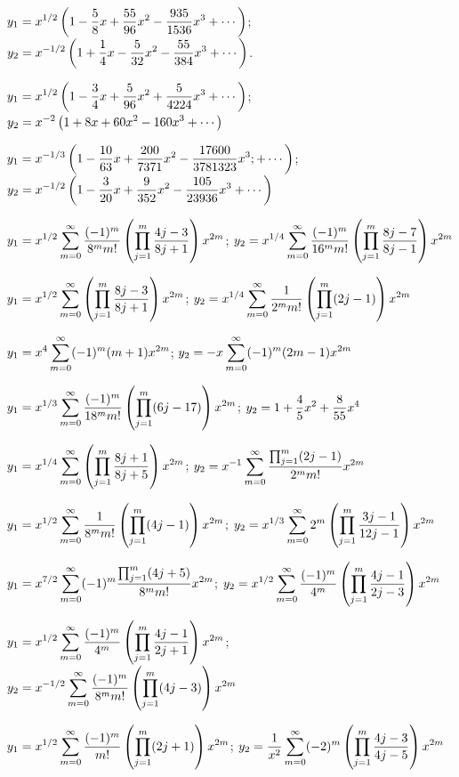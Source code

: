 $y_1=\displaystyle{x^{1/2}\left(1-\frac{5}{8}x+\frac{55}{96}x^2
-\frac{935}{1536}x^3+\cdots\right)}$;    \,
$y_2=\displaystyle{x^{-1/2}\left(1+\frac{1}{4}x-\frac{5}{32}x^2
-\frac{55}{384}x^3+\cdots\right)}$.

$y_1=\displaystyle{x^{1/2}\left(1-\frac{3}{4}x+\frac{5}{96}x^2+\frac{5}{4224}x^3
+\cdots\right)}$;    \,
$y_2=\displaystyle{x^{-2}\left(1+8x+60x^2-160x^3+\cdots\right)}$

$y_1=\displaystyle{x^{-1/3}\left(1-\frac{10}{63}x+\frac{200}{7371}x^2-
\frac{17600}{3781323}x^3;
+\cdots\right)}$;    \,
$y_2=\displaystyle{x^{-1/2}\left(1-\frac{3}{20}x+\frac{9}{352}x^2
-\frac{105}{23936}x^3
+\cdots\right)}$

$y_1=\displaystyle{x^{1/2}\sum_{m=0}^\infty\frac{(-1)^m}{8^mm!}\left(\prod_{j=1}^m\frac{4j-3}{8j+1}\right)x^{2m}}$;
$y_2=\displaystyle{x^{1/4}\sum_{m=0}^\infty\frac{(-1)^m}{16^mm!}\left(\prod_{j=1}^m\frac{8j-7}{8j-1}\right)x^{2m}}$

$y_1=\displaystyle{x^{1/2}\sum_{m=0}^\infty\left(\prod_{j=1}^m\frac{8j-3}{8j+
1}\right)
x^{2m}}$;
$y_2=\displaystyle{x^{1/4}\sum_{m=0}^\infty\frac{1}{2^mm!}\left(\prod_{j=1}^m(2j-1)
\right)x^{2m}}$

$y_1=\displaystyle{x^4\sum_{m=0}^\infty(-1)^m(m+1)x^{2m}}$;
$y_2=-\displaystyle{x\sum_{m=0}^\infty(-1)^m(2m-1)x^{2m}}$

$y_1=\displaystyle{x^{1/3}\sum_{m=0}^\infty\frac{(-1)^m}{18^mm!}\left(\prod_{j=1}^m
(6j-17)\right) x^{2m}}$;
$y_2=\displaystyle{1+\frac{4}{5}x^2+\frac{8}{55}x^4}$

$y_1=\displaystyle{x^{1/4}\sum_{m=0}^\infty\left(\prod_{j=1}^m\frac{8j+1}{8j+5}
\right)x^{2m}}$;
$y_2=\displaystyle{x^{-1}\sum_{m=0}^\infty\frac{\prod_{j=1}^m(2j-1)}{2^mm!}
x^{2m}}$

$y_1=\displaystyle{x^{1/2}\sum_{m=0}^\infty\frac{1}{8^mm!}\left(\prod_{j=1}^m(4j-1)
\right)x^{2m}}$;
$y_2=\displaystyle{x^{1/3}\sum_{m=0}^\infty2^m\left(\prod_{j=1}^m\frac{3j-1}{12j-1}
\right) x^{2m}}$

$y_1=\displaystyle{x^{7/2}\sum_{m=0}^\infty(-1)^m\frac{\prod_{j=1}^m(4j+5)}{8^mm!}x^{2m}}$;
$y_2=\displaystyle{x^{1/2}\sum_{m=0}^\infty\frac{(-1)^m}{4^m}\left(\prod_{j=1}^m
\frac{4j-1}{2j-3}
\right)x^{2m}}$

$y_1=\displaystyle{x^{1/2}\sum_{m=0}^\infty\frac{(-1)^m}{4^m}\left(\prod_{j=1}^m
\frac{4j-1}{2j+1}\right)x^{2m}}$;
$y_2=\displaystyle{x^{-1/2}\sum_{m=0}^\infty\frac{(-1)^m}{8^mm!}\left(\prod_{j=1}^m
(4j-3)\right)x^{2m}}$

$y_1=\displaystyle{x^{1/2}\sum_{m=0}^\infty\frac{(-1)^m}{m!}\left(\prod_{j=1}^m(2j+1)\right) x^{2m}}$;
$y_2=\displaystyle{\frac{1}{x^2}\sum_{m=0}^\infty(-2)^m\left(\prod_{j=1}^m\frac{4j-3}{4j-5}\right) x^{2m}}$

